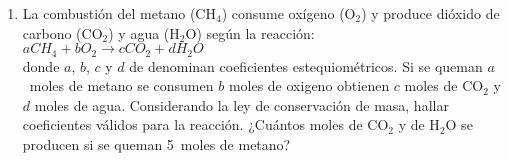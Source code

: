 \documentclass[a4paper]{article}
\begin{document}
\begin{enumerate}
\begin{enumerate} [label=(\alph*)]
		\item La combustión del metano (CH$_4$) consume oxígeno (O$_2$) y produce dióxido de carbono (CO$_2$) y agua (H$_2$O) según la reacción: \\ \phantom{-------------------------------------------------}$ aCH_4 + bO_2 \to cCO_2 + d H_{2}O$ \\ donde $a$, $b$, $c$ y $d$ de denominan coeficientes estequiométricos. Si se queman $a$~moles de metano se consumen $b$ moles de oxigeno obtienen $c$ moles de CO$_2$ y $d$ moles de agua. Considerando la ley de conservación de masa, hallar coeficientes válidos para la reacción. ¿Cuántos moles de CO$_2$ y de H$_2$O se producen si se queman 5~moles de metano? 
	\end{enumerate}
\end{enumerate}
\vspace{20pt} 
\end{document}
